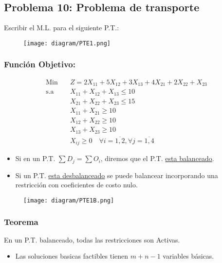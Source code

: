 \documentclass{templateNote}
\begin{document}
\subsection*{Problema 10: Problema de transporte}
Escribir el M.L. para el siguiente P.T.:
\begin{figure}[H]
    \centering
    \texttt{[image: diagram/PTE1.png]}
\end{figure}

\subsubsection*{Función Objetivo:}
\begin{equation*}
    \begin{aligned}
        \text{Min} \quad & Z = 2X_{11} + 5X_{12} + 3X_{13} + 4X_{21} + 2X_{22} + X_{23}\\
        \text{s.a} \quad & X_{11} + X_{12} + X_{13} \leq 10 \\
        & X_{21} + X_{22} + X_{23} \leq 15 \\
        & X_{11} + X_{21} \geq 10 \\
        & X_{12} + X_{22} \geq 10 \\
        & X_{13} + X_{23} \geq 10 \\
        & X_{ij} \geq 0 \quad \forall i = \overline{1,2}, \forall j = \overline{1,4}
    \end{aligned}
\end{equation*}
\begin{itemize}
    \item Si en un P.T. $\sum{D_j} = \sum{O_i}$, diremos que el P.T. \underline{esta balanceado}.
\end{itemize}

\newpage
\begin{itemize}
    \item Si un P.T. \underline{esta desbalanceado} se puede balancear incorporando una restricción con coeficientes de costo nulo.
\end{itemize}
\begin{figure}[H]
    \centering
    \texttt{[image: diagram/PTE1B.png]}
\end{figure}

\subsubsection*{Teorema}
En un P.T. balanceado, todas las restricciones son Activas.
\begin{itemize}
    \item Las soluciones basicas factibles tienen $m+n-1$ variables básicas.
\end{itemize}
\end{document}
